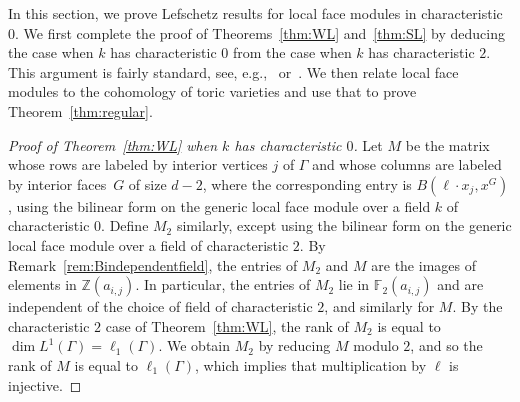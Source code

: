 \documentclass[11pt]{article}
\theoremstyle{definition}
\numberwithin{equation}{section}
\def\Z{\mathbb{Z}}
\numberwithin{equation}{section}
\begin{document}
In this section, we prove Lefschetz results for local face modules in characteristic $0$. We first complete the proof of Theorems~\ref{thm:WL} and~\ref{thm:SL} by deducing the case when $k$ has characteristic $0$ from the case when $k$ has characteristic $2$. This argument is fairly standard, see, e.g.,~\cite[Section 5]{KaruXiao} or~\cite[Proposition 3.5]{KLS}. 
We then relate local face modules to the cohomology of toric varieties and use that to prove Theorem~\ref{thm:regular}.

\begin{proof}[Proof of Theorem~\ref{thm:WL} when $k$ has characteristic $0$]
Let $M$ be the matrix whose rows are labeled by interior vertices $j$ of $\Gamma$ and whose columns are labeled by interior faces~$G$ of size $d-2$, where the corresponding entry is $B(\ell \cdot x_j, x^G)$, using the bilinear form on the generic local face module over a field $k$ of characteristic $0$. Define $M_2$ similarly, except using the bilinear form on the generic local face module over a field of characteristic $2$. 
By Remark~\ref{rem:Bindependentfield}, the entries of $M_2$ and $M$ are the images of elements in $\Z(a_{i,j})$. In particular, 
the entries of $M_2$ lie in $\mathbb{F}_2(a_{i,j})$ and are independent of the choice of field of characteristic $2$, and similarly for $M$. By the characteristic $2$ case of Theorem~\ref{thm:WL}, the rank of $M_2$ is equal to $\dim L^1(\Gamma) = \ell_1(\Gamma)$. We obtain $M_2$ by reducing $M$ modulo $2$, and so the rank of $M$ is equal to $\ell_1(\Gamma)$, which implies that multiplication by $\ell$ is injective. 
\end{proof}
\end{document}

